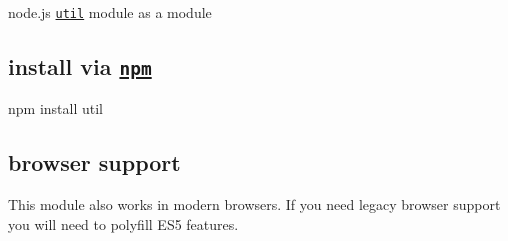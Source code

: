\href{https://travis-ci.org/defunctzombie/node-util}{\tt }

node.\+js \href{http://nodejs.org/api/util.html}{\tt util} module as a module

\subsection*{install via \href{npmjs.org}{\tt npm}}


\begin{DoxyCode}
npm install util
\end{DoxyCode}


\subsection*{browser support}

This module also works in modern browsers. If you need legacy browser support you will need to polyfill E\+S5 features. 